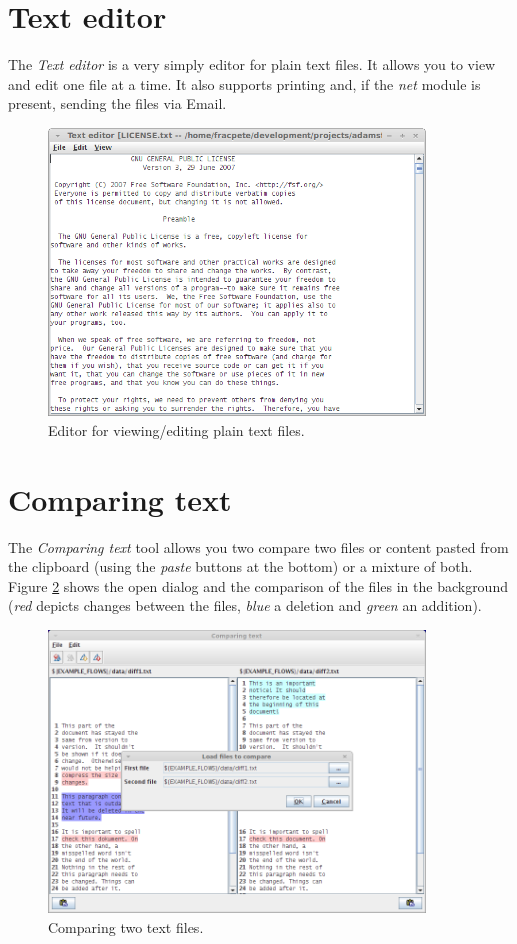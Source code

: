 \section{Text editor}
The \textit{Text editor} is a very simply editor for plain text files. It 
allows you to view and edit one file at a time. It also supports printing
and, if the \textit{net} module is present, sending the files via Email.

\begin{figure}[htb]
  \centering
  \includegraphics[width=10.0cm]{images/texteditor.png}
  \caption{Editor for viewing/editing plain text files.}
  \label{texteditor}
\end{figure}

\clearpage
\newpage
\section{Comparing text}
The \textit{Comparing text} tool allows you two compare two files or content 
pasted from the clipboard (using the \textit{paste} buttons at the bottom) or
a mixture of both. Figure \ref{diff-files} shows the open dialog and the
comparison of the files in the background (\textit{red} depicts changes 
between the files, \textit{blue} a deletion and \textit{green} an addition).

\begin{figure}[htb]
  \centering
  \includegraphics[width=10.0cm]{images/diff-files.png}
  \caption{Comparing two text files.}
  \label{diff-files}
\end{figure}

